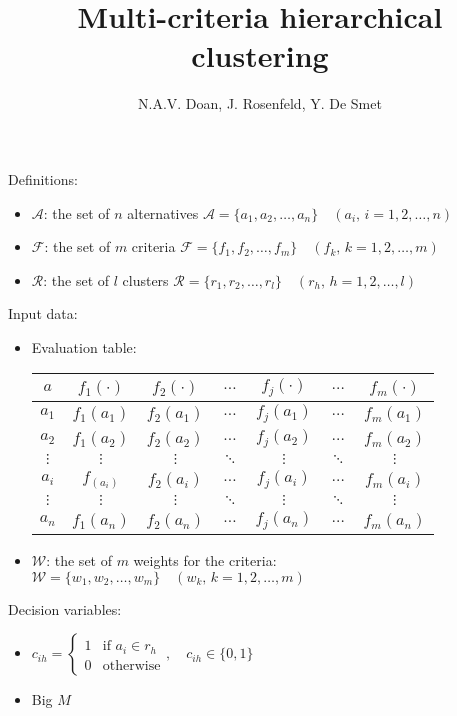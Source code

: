\documentclass[a4paper]{article}
\title{Multi-criteria hierarchical clustering}
\author{N.A.V. Doan, J. Rosenfeld, Y. De Smet}
\date{}
\begin{document}
    \maketitle
    Definitions:
    \begin{itemize}
        \item $\mathcal{A}$: the set of $n$ alternatives $\mathcal{A} = \{a_1, a_2, \dots, a_n\} \quad (a_i,\, i = 1, 2, \dots, n)$
        \item $\mathcal{F}$: the set of $m$ criteria $\mathcal{F} = \{f_1, f_2, \dots, f_m\} \quad (f_k,\, k = 1, 2, \dots, m)$
        \item $\mathcal{R}$: the set of $l$ clusters $\mathcal{R} = \{r_1, r_2, \dots, r_l\} \quad (r_h,\, h = 1, 2, \dots, l)$
    \end{itemize}
    Input data:
    \begin{itemize}
        \item Evaluation table: \begin{tabular}{c|cccccc}
            \hline
            $a$ & $f_1(\cdot)$ & $f_2(\cdot)$ & $\dots$ & $f_j(\cdot)$ & $\dots$ & $f_m(\cdot)$\\
            \hline
            $a_1$ & $f_1(a_1)$ & $f_2(a_1)$ & $\dots$ & $f_j(a_1)$ & $\dots$ & $f_m(a_1)$\\
            $a_2$ & $f_1(a_2)$ & $f_2(a_2)$ & $\dots$ & $f_j(a_2)$ & $\dots$ & $f_m(a_2)$\\
            $\vdots$ & $\vdots$ & $\vdots$ & $\ddots$ & $\vdots$ & $\ddots$ & $\vdots$\\
            $a_i$ & $f_(a_i)$ & $f_2(a_i)$ & $\dots$ & $f_j(a_i)$ & $\dots$ & $f_m(a_i)$\\
            $\vdots$ & $\vdots$ & $\vdots$ & $\ddots$ & $\vdots$ & $\ddots$ & $\vdots$\\
            $a_n$ & $f_1(a_n)$ & $f_2(a_n)$ & $\dots$ & $f_j(a_n)$ & $\dots$ & $f_m(a_n)$\\
            \hline
        \end{tabular}
        \item $\mathcal{W}$: the set of $m$ weights for the criteria: $\mathcal{W} = \{w_1, w_2, \dots, w_m\} \quad (w_k,\, k = 1, 2, \dots, m)$
    \end{itemize}
    Decision variables:
    \begin{itemize}
        \item $c_{ih} = \begin{cases}
            1 & \text{if } a_i \in r_h \\
            0 & \text{otherwise}
        \end{cases}, \quad c_{ih} \in \{0, 1\}$
        \item Big $M$
    \end{itemize}
\end{document}
